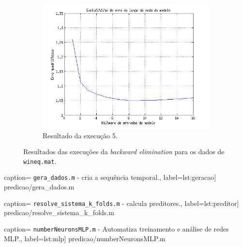 \begin{figure}[H]
			\begin{subfigure}{.5\textwidth}
				  \centering
				  \includegraphics[width=1\linewidth]{image/backward5_2}
				  \caption{Resultado da execução 5.}
				  \label{backward5_2}
				\end{subfigure}	
			
			\caption{Resultados das execuções da \textit{backward elimination} para os
			dados de \texttt{wineq.mat}.}
			\label{fig:back2}
			\end{figure}
			
		\FloatBarrier
		
		\newpage
		
		 caption={ \texttt{gera\_dados.m} - cria a
		sequência temporal.}, label={lst:geracao}] {predicao/gera_dados.m}
		
		 caption={
		\texttt{resolve\_sistema\_k\_folds.m} - calcula preditores.},
		label={lst:preditor}] {predicao/resolve_sistema_k_folds.m}
		
		 caption={ 
		\texttt{numberNeuronsMLP.m} - Automatiza treinamento e análise de redes MLP.},
		label={lst:mlp}] {predicao/numberNeuronsMLP.m}
		
		\FloatBarrier
		
